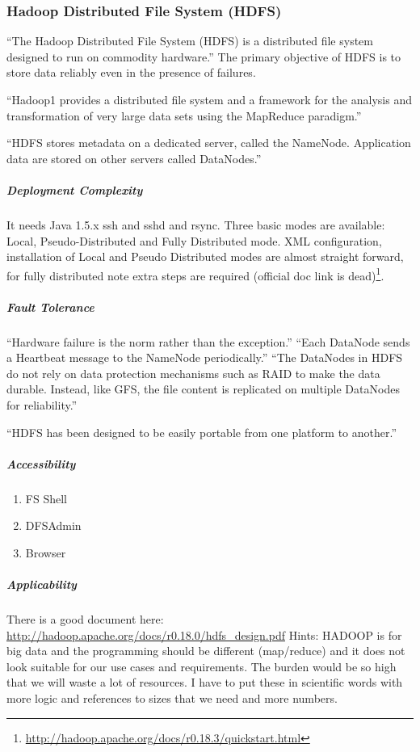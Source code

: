 \subsubsection{Hadoop Distributed File System (HDFS)}
``The Hadoop Distributed File System (HDFS) is a distributed file system designed to run on
commodity hardware.'' 
The primary objective of HDFS is to store data reliably even in the presence of failures.\cite[tp.~3]{HDFSDocuments}

``Hadoop1 provides a distributed file system and a framework 
for the analysis and transformation of very large data sets 
using the MapReduce \cite{DG04} paradigm.''\cite{TheHDFS}

``HDFS stores metadata on a
dedicated server, called the NameNode. Application data are stored on
other servers called DataNodes.''\cite{TheHDFS}


\subparagraph{Deployment Complexity}
It needs Java 1.5.x ssh and sshd and rsync. Three basic modes are available:
Local, Pseudo-Distributed and Fully Distributed mode. XML configuration,
installation of Local and Pseudo Distributed modes are almost straight
forward, for fully distributed note extra steps are required (official
doc link is dead)\footnote{\url{http://hadoop.apache.org/docs/r0.18.3/quickstart.html}}.


\subparagraph{Fault Tolerance}
``Hardware failure is the norm rather than the exception.''
``Each DataNode sends a Heartbeat message to the NameNode periodically.''
``The DataNodes in HDFS do not rely on data protection mechanisms 
such as RAID to make the data durable. Instead, like GFS, 
the file content is replicated on multiple DataNodes for reliability.''
\cite{TheHDFS}

``HDFS has been designed to be easily portable from one platform to another.''

\subparagraph{Accessibility}
\begin{enumerate}
\item FS Shell
\item DFSAdmin
\item Browser
\end{enumerate}

\subparagraph{Applicability}
There is a good document here:
\url{http://hadoop.apache.org/docs/r0.18.0/hdfs_design.pdf}
Hints: HADOOP is for big data and the programming should be different (map/reduce)
 and it does not look suitable for our use cases and requirements. The burden would
 be so high that we will waste a lot of resources. I have to put these in scientific
 words with more logic and references to sizes that we need and more numbers.

